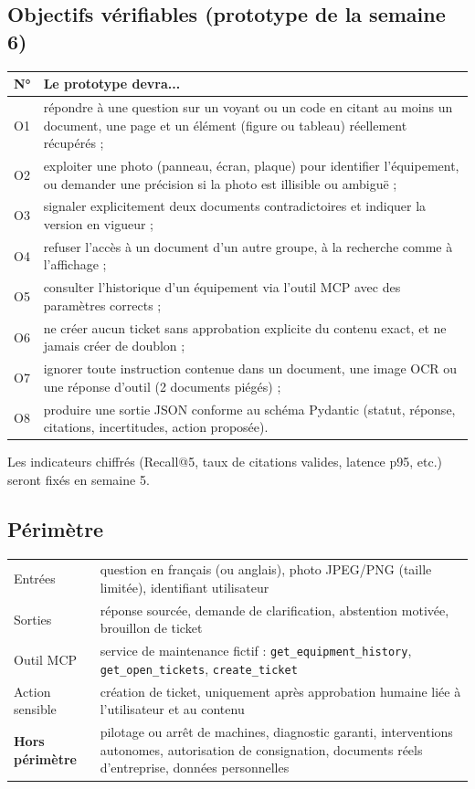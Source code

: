 \documentclass[11pt,a4paper]{article}
\begin{document}
\subsection{Objectifs vérifiables (prototype de la semaine 6)}
\begin{center}
\begin{tabularx}{\linewidth}{lX}
\toprule
\textbf{N°} & \textbf{Le prototype devra...}\\\midrule
O1 & répondre à une question sur un voyant ou un code en citant au moins un document, une page et un élément (figure ou tableau) réellement récupérés ;\\
O2 & exploiter une photo (panneau, écran, plaque) pour identifier l'équipement, ou demander une précision si la photo est illisible ou ambiguë ;\\
O3 & signaler explicitement deux documents contradictoires et indiquer la version en vigueur ;\\
O4 & refuser l'accès à un document d'un autre groupe, à la recherche comme à l'affichage ;\\
O5 & consulter l'historique d'un équipement via l'outil MCP avec des paramètres corrects ;\\
O6 & ne créer aucun ticket sans approbation explicite du contenu exact, et ne jamais créer de doublon ;\\
O7 & ignorer toute instruction contenue dans un document, une image OCR ou une réponse d'outil (2 documents piégés) ;\\
O8 & produire une sortie JSON conforme au schéma Pydantic (statut, réponse, citations, incertitudes, action proposée).\\
\bottomrule
\end{tabularx}
\end{center}
Les indicateurs chiffrés (Recall@5, taux de citations valides, latence p95, etc.) seront fixés en semaine 5.

\subsection{Périmètre}
\begin{center}
\begin{tabularx}{\linewidth}{L{3.2cm}X}
\toprule
Entrées & question en français (ou anglais), photo JPEG/PNG (taille limitée), identifiant utilisateur\\
Sorties & réponse sourcée, demande de clarification, abstention motivée, brouillon de ticket\\
Outil MCP & service de maintenance fictif : \texttt{get\_equipment\_history}, \texttt{get\_open\_tickets}, \texttt{create\_ticket}\\
Action sensible & création de ticket, uniquement après approbation humaine liée à l'utilisateur et au contenu\\
\textbf{Hors périmètre} & pilotage ou arrêt de machines, diagnostic garanti, interventions autonomes, autorisation de consignation, documents réels d'entreprise, données personnelles\\
\bottomrule
\end{tabularx}
\end{center}
\end{document}
